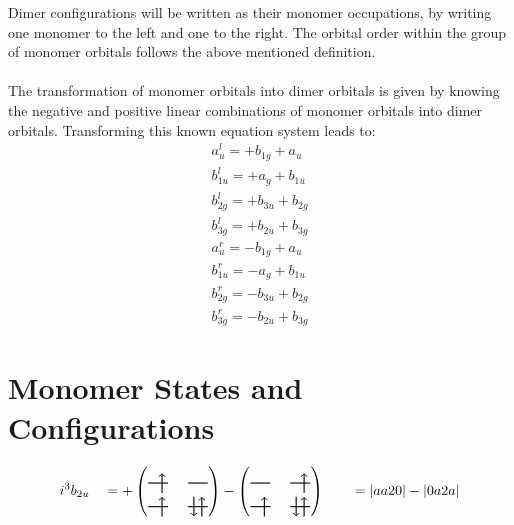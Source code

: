 \documentclass{article}
\begin{document}
Dimer configurations will be written as their monomer occupations, by writing one monomer to the left and one to the right. The orbital order within the group of monomer orbitals follows the above mentioned definition. \\ \\ The transformation of monomer orbitals into dimer orbitals is given by knowing the negative and positive linear combinations of monomer orbitals into dimer orbitals. Transforming this known equation system leads to: 
\begin{subequations}\begin{gather}
a_{u}^{l} = +b_{1g}+a_{u}  \\
b_{1u}^{l} = +a_{g}+b_{1u}  \\
b_{2g}^{l} = +b_{3u}+b_{2g}  \\
b_{3g}^{l} = +b_{2u}+b_{3g}  \\
a_{u}^{r} = -b_{1g}+a_{u}  \\
b_{1u}^{r} = -a_{g}+b_{1u}  \\
b_{2g}^{r} = -b_{3u}+b_{2g}  \\
b_{3g}^{r} = -b_{2u}+b_{3g}\end{gather}\end{subequations}
\newpage

\section{Monomer States and Configurations} 

\[i^3 b_{2u}
\quad = + \left(\begin{tikzpicture}[baseline={(current bounding box.center)}]
    \draw[thick] (0,0) -- (0.5,0); %
    \draw[thick] (1,0) -- (1.5,0); %
    \draw[thick] (0,-0.6) -- (0.5,-0.6); %
    \draw[thick] (1,-0.6) -- (1.5,-0.6); %
\draw[->, thick] (0.35, -0.25) -- (0.35, 0.25); 
\draw[-> , thick] (0.35, -0.85) -- (0.35, -0.35); 
 \draw[-> , thick] (1.35, -0.85) -- (1.35, -0.35); 
\draw[<- , thick] (1.15, -0.85) -- (1.15, -0.35); 
\end{tikzpicture}\right)-\left(\begin{tikzpicture}[baseline={(current bounding box.center)}]
    \draw[thick] (0,0) -- (0.5,0); %
    \draw[thick] (1,0) -- (1.5,0); %
    \draw[thick] (0,-0.6) -- (0.5,-0.6); %
    \draw[thick] (1,-0.6) -- (1.5,-0.6); %
\draw[->, thick] (1.35, -0.25) -- (1.35, 0.25); 
\draw[-> , thick] (0.35, -0.85) -- (0.35, -0.35); 
 \draw[-> , thick] (1.35, -0.85) -- (1.35, -0.35); 
\draw[<- , thick] (1.15, -0.85) -- (1.15, -0.35); 
\end{tikzpicture}\right) \qquad = \left|aa20\right|-\left|0a2a\right| \]
\end{document}

